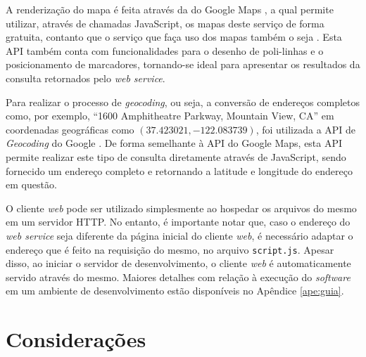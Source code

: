 A renderização do mapa é feita através da  do Google Maps \cite{gmapsapi}, a qual permite utilizar, através de chamadas JavaScript, os mapas deste serviço de forma gratuita, contanto que o serviço que faça uso dos mapas também o seja \cite{gmapsterms}.
Esta API também conta com funcionalidades para o desenho de poli-linhas e o posicionamento de marcadores, tornando-se ideal para apresentar os resultados da consulta retornados pelo \emph{web service}.

Para realizar o processo de \emph{geocoding}, ou seja, a conversão de endereços completos como, por exemplo, ``1600 Amphitheatre Parkway, Mountain View, CA'' em coordenadas geográficas como $(37.423021, -122.083739)$, foi utilizada a API de \emph{Geocoding} do Google \cite{geocodingapi}.
De forma semelhante à API do Google Maps, esta API permite realizar este tipo de consulta diretamente através de JavaScript, sendo fornecido um endereço completo e retornando a latitude e longitude do endereço em questão.

O cliente \emph{web} pode ser utilizado simplesmente ao hospedar os arquivos do mesmo em um servidor HTTP.
No entanto, é importante notar que, caso o endereço do \emph{web service} seja diferente da página inicial do cliente \emph{web}, é necessário adaptar o endereço que é feito na requisição do mesmo, no arquivo \texttt{script.js}.
Apesar disso, ao iniciar o servidor de desenvolvimento, o cliente \emph{web} é automaticamente servido através do mesmo.
Maiores detalhes com relação à execução do \emph{software} em um ambiente de desenvolvimento estão disponíveis no Apêndice \ref{ape:guia}.

\section{Considerações}
